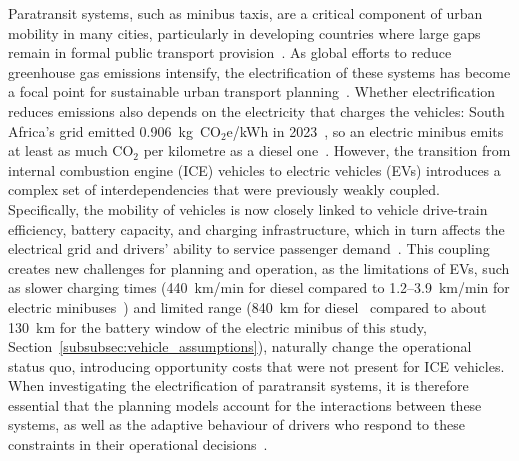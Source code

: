 \documentclass{elsarticle}
\begin{document}
Paratransit systems, such as minibus taxis, are a critical component of urban mobility in many cities, particularly in developing countries where large gaps remain in formal public transport provision~\cite{behrens2015_paratransit, bhuyan2024_paratransit_services_and_socio_econ_planning}. As global efforts to reduce greenhouse gas emissions intensify, the electrification of these systems has become a focal point for sustainable urban transport planning~\cite{collett2021_ev_good_ssa, nasac2024_decarbonising_transport_in_africa, bankole2026_electrifying_paratransit_ssa}. Whether electrification reduces emissions also depends on the electricity that charges the vehicles: South Africa's grid emitted 0.906~kg~CO$_2$e/kWh in 2023~\cite{dffe2025_south_africa_grid_emission_factors}, so an electric minibus emits at least as much CO$_2$ per kilometre as a diesel one~\cite{sello2026_embt_in_cpt}. However, the transition from internal combustion engine (ICE) vehicles to electric vehicles (EVs) introduces a complex set of interdependencies that were previously weakly coupled. Specifically, the mobility of vehicles is now closely linked to vehicle drive-train efficiency, battery capacity, and charging infrastructure, which in turn affects the electrical grid and drivers' ability to service passenger demand~\cite{booysen2025_sys_of_sys_em_planning}. This coupling creates new challenges for planning and operation, as the limitations of EVs, such as slower charging times (440~km/min for diesel compared to 1.2--3.9~km/min for electric minibuses~\cite{booysen2025_sys_of_sys_em_planning, sello2026_ekamva_performance}) and limited range (840~km for diesel~\cite{booysen2025_sys_of_sys_em_planning} compared to about 130~km for the battery window of the electric minibus of this study, Section~\ref{subsubsec:vehicle_assumptions}), naturally change the operational status quo, introducing opportunity costs that were not present for ICE vehicles. When investigating the electrification of paratransit systems, it is therefore essential that the planning models account for the interactions between these systems, as well as the adaptive behaviour of drivers who respond to these constraints in their operational decisions~\cite{sello2026_planning_paradigms, waraich2013_phev_smart_grids, sheppard2017_beam}.

\end{document}
